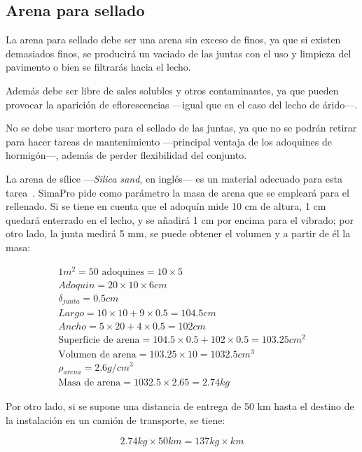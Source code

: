 \subsection{Arena para sellado}

La arena para sellado debe ser una arena sin exceso de finos, ya que si existen demasiados finos, se producirá un vaciado de las juntas con el uso y limpieza del pavimento o bien se filtrarás hacia el lecho.

Además debe ser libre de sales solubles y otros contaminantes, ya que pueden provocar la aparición de eflorescencias —igual que en el caso del lecho de árido—.

No se debe usar mortero para el sellado de las juntas, ya que no se podrán retirar para hacer tareas de mantenimiento —principal ventaja de los adoquines de hormigón—, además de perder flexibilidad del conjunto.

La arena de sílice —\textit{Silica sand}, en inglés— es un material adecuado para esta tarea \cite{website:cement}. SimaPro pide como parámetro la masa de arena que se empleará para el rellenado. Si se tiene en cuenta que el adoquín mide 10 \si{cm} de altura, 1 \si{cm} quedará enterrado en el lecho, y se añadirá 1 \si{cm} por encima para el vibrado; por otro lado, la junta medirá 5 \si{mm}, se puede obtener el volumen y a partir de él la masa:

\begin{gather}
1 m^2 = 50 \text{ adoquines} = 10 \times 5\\
Adoquin = 20 \times 10 \times 6 cm\\
\delta_{junta} = 0.5cm\\
Largo = 10 \times 10 + 9 \times 0.5 = 104.5 cm\\
Ancho = 5 \times 20 + 4 \times 0.5 = 102 cm\\
\text{Superficie de arena} = 104.5 \times 0.5 + 102 \times 0.5 = 103.25 cm^2\\
\text{Volumen de arena} = 103.25 \times 10 = 1032.5 cm^3\\
\rho_{arena}=2.6 g/cm^3\\
\text{Masa de arena} = 1032.5 \times 2.65 = 2.74 kg
\end{gather}

Por otro lado, si se supone una distancia de entrega de 50 km hasta el destino de la instalación en un camión de transporte, se tiene:

\begin{equation}
2.74 kg \times 50 km = 137 kg \times km
\end{equation}

